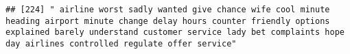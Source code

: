 \documentclass[
]{article}
\begin{document}
\begin{verbatim}
## [224] " airline worst sadly wanted give chance wife cool minute heading airport minute change delay hours counter friendly options explained barely understand customer service lady bet complaints hope day airlines controlled regulate offer service"                                                                                                                                                                                                                                                                                                                                                                                                                                                                                                                                                                                                                                                                                                                                                                                                                                                                                                                                                                                                                                                                                                                                                                                                                                                                                                                                                                                                                                                                                                                                              

\end{verbatim}
\end{document}
